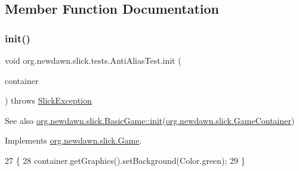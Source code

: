 \subsection{Member Function Documentation}
\mbox{\label{classorg_1_1newdawn_1_1slick_1_1tests_1_1_anti_alias_test_a1c6a933bba1b9045e6cc0aa1e2d6ae1e}} 
\subsubsection{\texorpdfstring{init()}{init()}}
{\footnotesize\ttfamily void org.\+newdawn.\+slick.\+tests.\+Anti\+Alias\+Test.\+init (\begin{DoxyParamCaption}\item[{\mbox{\hyperlink{classorg_1_1newdawn_1_1slick_1_1_game_container}{Game\+Container}}}]{container }\end{DoxyParamCaption}) throws \mbox{\hyperlink{classorg_1_1newdawn_1_1slick_1_1_slick_exception}{Slick\+Exception}}\hspace{0.3cm}{\ttfamily [inline]}}

\begin{DoxySeeAlso}{See also}
\mbox{\hyperlink{classorg_1_1newdawn_1_1slick_1_1_basic_game_a8af0900217e4d389249f71367b22d114}{org.\+newdawn.\+slick.\+Basic\+Game\+::init}}(\mbox{\hyperlink{classorg_1_1newdawn_1_1slick_1_1_game_container}{org.\+newdawn.\+slick.\+Game\+Container}}) 
\end{DoxySeeAlso}


Implements \mbox{\hyperlink{interfaceorg_1_1newdawn_1_1slick_1_1_game_ad2dd6affab08bb8fdb5fab0815957b7a}{org.\+newdawn.\+slick.\+Game}}.


\begin{DoxyCode}
27                                                                     \{
28         container.getGraphics().setBackground(Color.green);
29     \}
\end{DoxyCode}
\mbox{\label{classorg_1_1newdawn_1_1slick_1_1tests_1_1_anti_alias_test_aa753fc217014868f18f77f9a4d3b1098}} 
